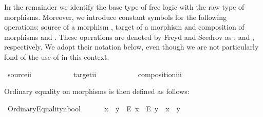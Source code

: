 \begin{isabellebody}
\begin{isamarkuptext}
In the remainder we identify the base type  of free logic with the raw type of 
morphisms. Moreover, we introduce constant symbols for the following operations: 
source of a morphism , target of a morphism  and composition of morphisms
 and . These operations are denoted by Freyd and Scedrov as 
,  and , respectively.
We adopt their notation below, even though  we are not particularly fond of 
the use of \isa{{\isasymbox}} in this context.%
\end{isamarkuptext}%
\isamarkuptrue%
\isamarkupfalse%
\ source{\isacharcolon}{\isacharcolon}{\isachardoublequoteopen}i{\isasymRightarrow}i{\isachardoublequoteclose}\ {\isacharparenleft}{\isachardoublequoteopen}{\isasymbox}{\isacharunderscore}{\isachardoublequoteclose}\ {\isacharbrackleft}{}{}{}{\isacharbrackright}\ {}{}{}{\isacharparenright}\ \isanewline
\ \ \ \ \ \ \ target{\isacharcolon}{\isacharcolon}{\isachardoublequoteopen}i{\isasymRightarrow}i{\isachardoublequoteclose}\ {\isacharparenleft}{\isachardoublequoteopen}{\isacharunderscore}{\isasymbox}{\isachardoublequoteclose}\ {\isacharbrackleft}{}{}{}{\isacharbrackright}\ {}{}{}{\isacharparenright}\ \isanewline
\ \ \ \ \ \ \ composition{\isacharcolon}{\isacharcolon}{\isachardoublequoteopen}i{\isasymRightarrow}i{\isasymRightarrow}i{\isachardoublequoteclose}\ {\isacharparenleft}\ {\isachardoublequoteopen}{\isasymcdot}{\isachardoublequoteclose}\ {}{}{}{\isacharparenright}%
\begin{isamarkuptext}%
Ordinary equality on morphisms is then defined as follows:%
\end{isamarkuptext}%
\isamarkuptrue%
\isamarkupfalse%
\ OrdinaryEquality{\isacharcolon}{\isacharcolon}{\isachardoublequoteopen}i{\isasymRightarrow}i{\isasymRightarrow}bool{\isachardoublequoteclose}\ {\isacharparenleft}\ {\isachardoublequoteopen}{\isasymapprox}{\isachardoublequoteclose}\ {}{}{\isacharparenright}\ \isanewline
\ \ {\isachardoublequoteopen}x\ {\isasymapprox}\ y\ {\isasymequiv}\ {\isacharparenleft}{\isacharparenleft}\isactrlbold E\ x{\isacharparenright}\ \isactrlbold {\isasymleftrightarrow}\ {\isacharparenleft}\isactrlbold E\ y{\isacharparenright}{\isacharparenright}\ \isactrlbold {\isasymand}\ x\ \isactrlbold {\isacharequal}\ y{\isachardoublequoteclose}%

\end{isabellebody}
